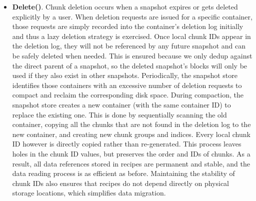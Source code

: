 \begin{itemize}
\item
\noindent\textbf{Delete()}.
Chunk deletion occurs when a snapshot expires or gets deleted explicitly by a user. 
When deletion requests are issued for a specific container,
those requests are simply recorded into the  container's deletion log initially and thus  a lazy
deletion strategy is exercised.
Once local chunk IDs appear in
the deletion log, they will not be referenced by any future snapshot and can be safely deleted when needed. 
This is ensured because we only dedup against the direct parent of a snapshot, so the deleted snapshot's blocks
will only be used if they also exist in other snapshots.
Periodically, the snapshot  store identifies those containers with an excessive
number of deletion requests to  compact and  reclaim the corresponding disk space. 
During compaction, the snapshot store creates a new container (with the same container ID) to replace the 
existing one. This is done by sequentially scanning the old container, copying all the chunks that are not 
found in the deletion log to the new container, and creating new chunk groups and indices. 
Every local chunk ID however is directly copied rather than re-generated. This
process leaves holes in the chunk ID values, but preserves the order and IDs of chunks.
As a result, all data references stored 
in recipes are permanent and stable, and the data reading process
is as efficient as before. Maintaining the stability of chunk IDs also ensures that recipes do not
depend directly on physical storage locations, which simplifies data migration.
\end{itemize}


